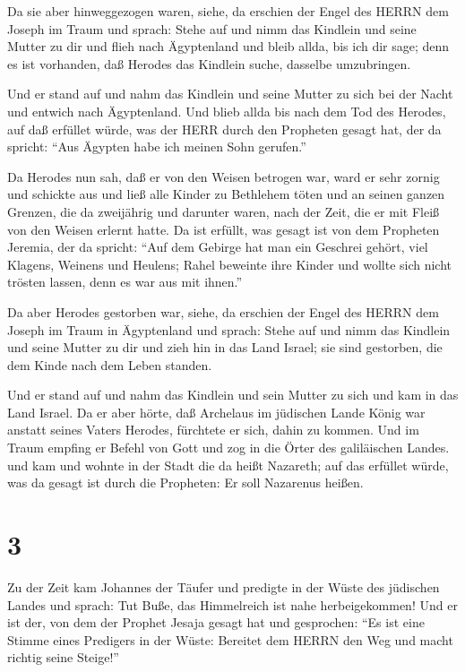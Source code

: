  Da sie aber hinweggezogen waren, siehe, da erschien der
Engel des HERRN dem Joseph im Traum und sprach: Stehe auf und nimm das
Kindlein und seine Mutter zu dir und flieh nach Ägyptenland und bleib
allda, bis ich dir sage; denn es ist vorhanden, daß Herodes das Kindlein
suche, dasselbe umzubringen.

 Und er stand auf und nahm das Kindlein und seine Mutter zu
sich bei der Nacht und entwich nach Ägyptenland.  Und blieb
allda bis nach dem Tod des Herodes, auf daß erfüllet würde, was der HERR
durch den Propheten gesagt hat, der da spricht: ``Aus Ägypten habe ich
meinen Sohn gerufen.''

 Da Herodes nun sah, daß er von den Weisen betrogen war,
ward er sehr zornig und schickte aus und ließ alle Kinder zu Bethlehem
töten und an seinen ganzen Grenzen, die da zweijährig und darunter
waren, nach der Zeit, die er mit Fleiß von den Weisen erlernt hatte.
 Da ist erfüllt, was gesagt ist von dem Propheten Jeremia,
der da spricht:  ``Auf dem Gebirge hat man ein Geschrei
gehört, viel Klagens, Weinens und Heulens; Rahel beweinte ihre Kinder
und wollte sich nicht trösten lassen, denn es war aus mit ihnen.''

 Da aber Herodes gestorben war, siehe, da erschien der
Engel des HERRN dem Joseph im Traum in Ägyptenland  und
sprach: Stehe auf und nimm das Kindlein und seine Mutter zu dir und zieh
hin in das Land Israel; sie sind gestorben, die dem Kinde nach dem Leben
standen.

 Und er stand auf und nahm das Kindlein und sein Mutter zu
sich und kam in das Land Israel.  Da er aber hörte, daß
Archelaus im jüdischen Lande König war anstatt seines Vaters Herodes,
fürchtete er sich, dahin zu kommen. Und im Traum empfing er Befehl von
Gott und zog in die Örter des galiläischen Landes.  und kam
und wohnte in der Stadt die da heißt Nazareth; auf das erfüllet würde,
was da gesagt ist durch die Propheten: Er soll Nazarenus heißen.

\hypertarget{section-2}{%
\section{3}\label{section-2}}

 Zu der Zeit kam Johannes der Täufer und predigte in der
Wüste des jüdischen Landes  und sprach: Tut Buße, das
Himmelreich ist nahe herbeigekommen!  Und er ist der, von
dem der Prophet Jesaja gesagt hat und gesprochen: ``Es ist eine Stimme
eines Predigers in der Wüste: Bereitet dem HERRN den Weg und macht
richtig seine Steige!''

